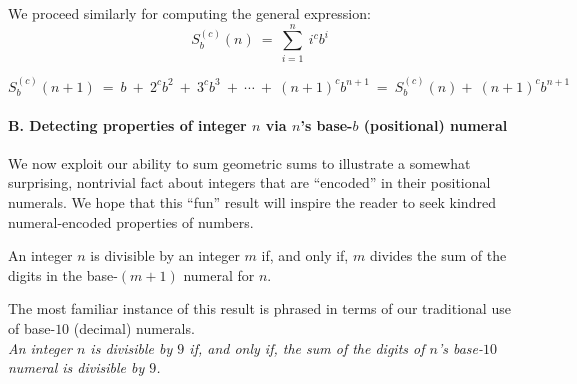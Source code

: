 We proceed similarly for computing the general expression: 
\[
S_b^{(c)}(n) \ = \ \sum_{i=1}^n \ i^c b^i
\]

\[
S_b^{(c)}(n+1)
 \ = \
b \ + \ 2^{c} b^2\ + \ 3^{c} b^3 \ + \ \cdots \ + \ (n+1)^{c} b^{n+1}
 \ = \
S_b^{(c)}(n) +  \ (n+1)^{c} b^{n+1}
\]


\paragraph{\sf B. Detecting properties of integer $n$ via $n$'s base-$b$ (positional) numeral}
We now exploit our ability to sum geometric sums to illustrate a
somewhat surprising, nontrivial fact about integers that are
``encoded'' in their positional numerals.  We hope that this ``fun''
result will inspire the reader to seek kindred numeral-encoded
properties of numbers.

\begin{prop}
\label{thm:div-by-b-bar}
An integer $n$ is divisible by an integer $m$ if, and only if, $m$
divides the sum of the digits in the base-$(m+1)$ numeral for $n$.
\end{prop}

The most familiar instance of this result is phrased in terms of our
traditional use of base-$10$ (decimal) numerals. \\
{\it An integer $n$ is divisible by $9$ if, and only if, the sum of
  the digits of $n$'s base-$10$ numeral is divisible by $9$.}

\smallskip

